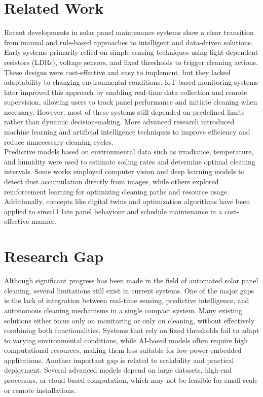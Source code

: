 \documentclass[10pt]{report}
\begin{document}
\begin{sloppypar}
{{{\begin{sloppypar}
\section{Related Work}
\hspace{0.5cm}
Recent developments in solar panel maintenance systems show a clear transition from manual and rule-based approaches to intelligent and data-driven solutions.
Early systems primarily relied on simple sensing techniques using light-dependent
resistors (LDRs), voltage sensors, and fixed thresholds to trigger cleaning actions.
These designs were cost-effective and easy to implement, but they lacked adaptability to changing environmental conditions. IoT-based monitoring systems later
improved this approach by enabling real-time data collection and remote supervision, allowing users to track panel performance and initiate cleaning when necessary. However, most of these systems still depended on predefined limits rather than
dynamic decision-making. More advanced research introduced machine learning
and artificial intelligence techniques to improve efficiency and reduce unnecessary
cleaning cycles.\\

Predictive models based on environmental data such as irradiance,
temperature, and humidity were used to estimate soiling rates and determine optimal cleaning intervals. Some works employed computer vision and deep learning
models to detect dust accumulation directly from images, while others explored reinforcement learning for optimizing cleaning paths and resource usage. Additionally,
concepts like digital twins and optimization algorithms have been applied to simu11
late panel behaviour and schedule maintenance in a cost-effective manner. 


\section{Research Gap}
\hspace{0.5cm}
Although significant progress has been made in the field of automated solar panel
cleaning, several limitations still exist in current systems. One of the major gaps
is the lack of integration between real-time sensing, predictive intelligence, and autonomous cleaning mechanisms in a single compact system. Many existing solutions
either focus only on monitoring or only on cleaning, without effectively combining
both functionalities. Systems that rely on fixed thresholds fail to adapt to varying
environmental conditions, while AI-based models often require high computational
resources, making them less suitable for low-power embedded applications. Another
important gap is related to scalability and practical deployment. Several advanced
models depend on large datasets, high-end processors, or cloud-based computation,
which may not be feasible for small-scale or remote installations. \\


\end{sloppypar}}}}
\end{sloppypar}
\end{document}
